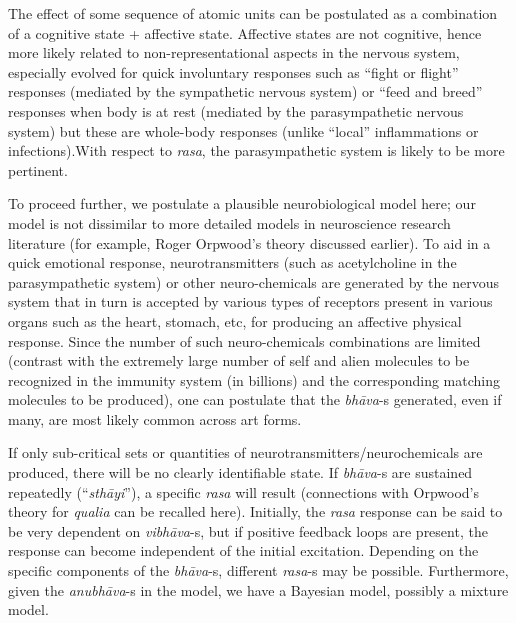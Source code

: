 The effect of some sequence of atomic units can be postulated as a combination of a cognitive state + affective state. Affective states are not cognitive, hence more likely related to non-representational aspects in the nervous system, especially evolved for quick involuntary responses such as “fight or flight” responses (mediated by the sympathetic nervous system) or “feed and breed” responses when body is at rest (mediated by the parasympathetic nervous system) but these are whole-body responses (unlike “local” inflammations or infections).\break With respect to \textsl{rasa}, the parasympathetic system is likely to be more pertinent. 

\newpage

To proceed further, we postulate a plausible neurobiological model here; our model is not dissimilar to more detailed models in neuroscience research literature (for example, Roger Orpwood’s theory discussed earlier). To aid in a quick emotional response, neurotransmitters (such as acetylcholine in the parasympathetic system) or other neuro-chemicals are generated by the nervous system that in turn is accepted by various types of receptors present in various organs such as the heart, stomach, etc, for producing an affective physical response. Since the number of such neuro-chemicals combinations are limited (contrast with the extremely large number of self and alien molecules to be recognized in the immunity system (in billions) and the corresponding matching molecules to be produced), one can postulate that the \textsl{bhāva}-s generated, even if many, are most likely common across art forms. 

If only sub-critical sets or quantities of neurotransmitters/neuro\-chemicals are produced, there will be no clearly identifiable state. If \textsl{bhāva}-s are sustained repeatedly (“\textsl{sthāyi}”), a specific \textsl{rasa} will result (connections with Orpwood’s theory for \textsl{qualia} can be recalled here). Initially, the \textsl{rasa} response can be said to be very dependent on \textsl{vibhāva}-s, but if positive feedback loops are present, the response can become independent of the initial excitation. Depending on the specific components of the \textsl{bhāva}-s, different \textsl{rasa}-s may be possible. Furthermore, given the \textsl{anubhāva}-s in the model, we have a Bayesian model, possibly a mixture model.

